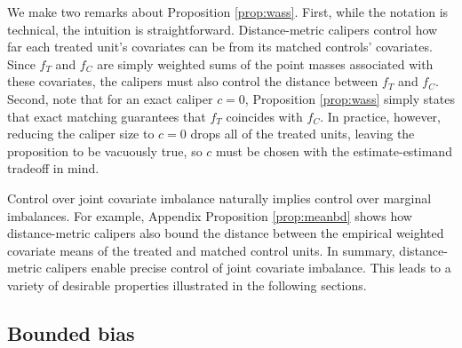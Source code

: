 \documentclass{article}
\newcommand{\Xt}{\mathbf{X}_t}
\newcommand{\Xj}{\mathbf{X}_j}
\begin{document}
We make two remarks about Proposition \ref{prop:wass}.
First, while the notation is technical, the intuition is straightforward.
Distance-metric calipers control how far each treated unit's covariates can be from its matched controls' covariates.
Since $f_T$ and $f_C$ are simply weighted sums of the point masses associated with these covariates, the calipers must also control the distance between $f_T$ and $f_C$.
Second, note that for an exact caliper $c=0$, Proposition \ref{prop:wass} simply states that exact matching guarantees that $f_T$ coincides with $f_C$.
In practice, however, reducing the caliper size to $c=0$ drops all of the treated units, leaving the proposition to be vacuously true, so $c$ must be chosen with the estimate-estimand tradeoff in mind.

Control over joint covariate imbalance naturally implies control over marginal imbalances.
For example, Appendix Proposition \ref{prop:meanbd} shows how distance-metric calipers also bound the distance between the empirical weighted covariate means of the treated and matched control units.
In summary, distance-metric calipers enable precise control of joint covariate imbalance.
This leads to a variety of desirable properties illustrated in the following sections.


\subsection{Bounded bias}
\label{sec:biasbd}
\end{document}
